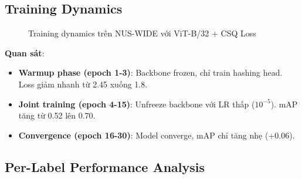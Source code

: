 \documentclass[12pt,a4paper]{article}
\begin{document}
\subsection{Training Dynamics}

\begin{figure}[H]
\centering
{}
\caption{Training dynamics trên NUS-WIDE với ViT-B/32 + CSQ Loss}
\label{fig:training_curve}
\end{figure}

\textbf{Quan sát}:
\begin{itemize}
    \item \textbf{Warmup phase (epoch 1-3)}: Backbone frozen, chỉ train hashing head. Loss giảm nhanh từ 2.45 xuống 1.8.
    \item \textbf{Joint training (epoch 4-15)}: Unfreeze backbone với LR thấp ($10^{-5}$). mAP tăng từ 0.52 lên 0.70.
    \item \textbf{Convergence (epoch 16-30)}: Model converge, mAP chỉ tăng nhẹ (+0.06).
\end{itemize}

\subsection{Per-Label Performance Analysis}
\end{document}
